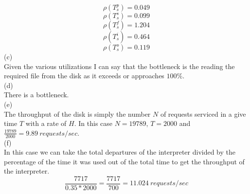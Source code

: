 \documentclass[letterpaper,11pt]{article}
\theoremstyle{mytheor}
\begin{document}
$$\rho(T_s^p) = 0.049$$
$$\rho(T_s^s) = 0.099$$
$$\rho(T_s^f) = 1.204$$
$$\rho(T_s^i) = 0.464$$
$$\rho(T_s^o) = 0.119$$
(c)\\ 
Given the various utilizations I can say that the bottleneck is the reading the required file from the disk as it exceeds or approaches $100\%$.\\
(d)\\
There is a bottleneck.\\
(e)\\
The throughput of the disk is simply the number $N$ of requests serviced in a give time $T$ with a rate of $H$. In this case $N = 19789$, $T = 2000$ and $\frac{19789}{2000} = 9.89\ requests/sec$.\\
(f)\\
In this case we can take the total departures of the interpreter divided by the percentage of the time it was used out of the total time to get the throughput of the interpreter.\\
$$\frac{7717}{0.35 * 2000} = \frac{7717}{700} = 11.024\ requests/sec$$
\end{document}
